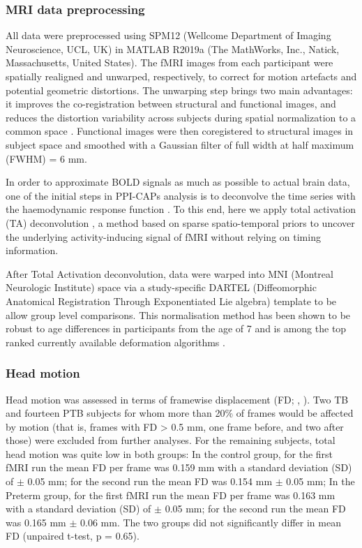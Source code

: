 \subsubsection{MRI data preprocessing} 
All data were preprocessed using SPM12 (Wellcome Department of Imaging Neuroscience, UCL, UK) in MATLAB R2019a (The MathWorks, Inc., Natick, Massachusetts, United States). The fMRI images from each participant were spatially realigned and unwarped, respectively, to correct for motion artefacts and potential geometric distortions. The unwarping step brings two main advantages: it improves the co-registration between structural and functional images, and reduces the distortion variability across subjects during spatial normalization to a common space \citep{Hutton2002}. Functional images were then coregistered to structural images in subject space and smoothed with a Gaussian filter of full width at half maximum (FWHM) = 6 mm. 

In order to approximate BOLD signals as much as possible to actual brain data, one of the initial steps in PPI-CAPs analysis is to deconvolve the time series with the haemodynamic response function \citep{Freitas2020}. To this end, here we apply total activation (TA) deconvolution \citep{Karahanoglu2013}, a method based on sparse spatio-temporal priors to uncover the underlying activity-inducing signal of fMRI without relying on timing information.

After Total Activation deconvolution, data were warped into MNI (Montreal Neurologic Institute) space via a study-specific DARTEL (Diffeomorphic Anatomical Registration Through Exponentiated Lie algebra) template to be allow group level comparisons. This normalisation method has been shown to be robust to age differences in participants from the age of 7 \citep{ASHBURNER1998, Burgund2002} and is among the top ranked currently available deformation algorithms \citep{Klein2009}.  


\subsubsection{Head motion} 
Head motion was assessed in terms of framewise displacement (FD; \citeauthor{Power2014a}, \citeyear{Power2014a}). Two TB and fourteen PTB subjects for whom more than 20\% of frames would be affected by motion (that is, frames with FD > 0.5 mm, one frame before, and two after those) were excluded from further analyses. For the remaining subjects, total head motion was quite low in both groups: In the control group, for the first fMRI run the mean FD per frame was 0.159 mm with a standard deviation (SD) of $\pm$ 0.05 mm; for the second run the mean FD was 0.154 mm $\pm$ 0.05 mm; In the Preterm group, for the first fMRI run the mean FD per frame was 0.163 mm with a standard deviation (SD) of $\pm$ 0.05 mm; for the second run the mean FD was 0.165 mm $\pm$ 0.06 mm. The two groups did not significantly differ in mean FD (unpaired t-test, p = 0.65). %

